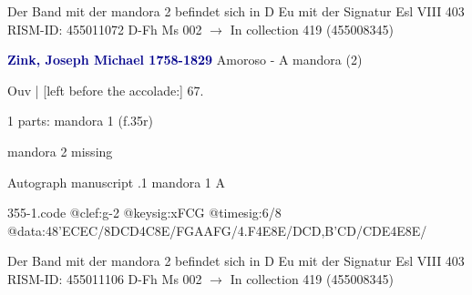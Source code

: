 \documentclass[twocolumn]{book}
\begin{document}
\newline Der Band mit der mandora 2 befindet sich in D Eu mit der Signatur Esl VIII 403
\newline RISM-ID: 455011072
\newline D-Fh  Ms 002
\newline $\rightarrow$ In collection 419 (455008345)
      
\newline \par \vspace{7pt} \textcolor{darkblue}{\textbf{Zink, Joseph Michael  1758-1829}}
\newline Amoroso - A
\newline mandora (2)
\newline \begin{itshape}[f.35r, at left:] Ouv | [left before the accolade:] 67.\end{itshape} 
\newline \textcolor{darkblue}{}  1 parts: mandora 1  (f.35r)
\newline \begin{small} mandora 2 missing\end{small} 
\newline Autograph manuscript
.1  mandora 1  A  
\begin{filecontents*}{355-1.code}
@clef:g-2
@keysig:xFCG
@timesig:6/8
@data:48'ECEC/8DCD4C8E/FGAAFG/4.F4E8E/DCD,B'CD/CDE4E8E/
\end{filecontents*}
\newline
%

\newline Der Band mit der mandora 2 befindet sich in D Eu mit der Signatur Esl VIII 403
\newline RISM-ID: 455011106
\newline D-Fh  Ms 002
\newline $\rightarrow$ In collection 419 (455008345)
      
\end{document}
